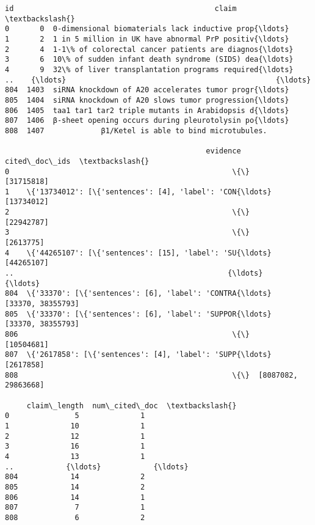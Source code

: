\documentclass[11pt]{article}
\makeatletter
\newcommand{\boxspacing}{\kern\kvtcb@left@rule\kern\kvtcb@boxsep}
\newcommand{\prompt}[4]{
        {\ttfamily\llap{{\color{#2}[#3]:\hspace{3pt}#4}}\vspace{-\baselineskip}}
    }
\makeatother
\begin{document}
            \begin{tcolorbox}[breakable, size=fbox, boxrule=.5pt, pad at break*=1mm, opacityfill=0]
\prompt{Out}{outcolor}{23}{\boxspacing}
\begin{Verbatim}[commandchars=\\\{\}]
       id                                              claim  \textbackslash{}
0       0  0-dimensional biomaterials lack inductive prop{\ldots}
1       2  1 in 5 million in UK have abnormal PrP positiv{\ldots}
2       4  1-1\% of colorectal cancer patients are diagnos{\ldots}
3       6  10\% of sudden infant death syndrome (SIDS) dea{\ldots}
4       9  32\% of liver transplantation programs required{\ldots}
..    {\ldots}                                                {\ldots}
804  1403  siRNA knockdown of A20 accelerates tumor progr{\ldots}
805  1404  siRNA knockdown of A20 slows tumor progression{\ldots}
806  1405  taa1 tar1 tar2 triple mutants in Arabidopsis d{\ldots}
807  1406  β-sheet opening occurs during pleurotolysin po{\ldots}
808  1407             β1/Ketel is able to bind microtubules.

                                              evidence        cited\_doc\_ids  \textbackslash{}
0                                                   \{\}           [31715818]
1    \{'13734012': [\{'sentences': [4], 'label': 'CON{\ldots}           [13734012]
2                                                   \{\}           [22942787]
3                                                   \{\}            [2613775]
4    \{'44265107': [\{'sentences': [15], 'label': 'SU{\ldots}           [44265107]
..                                                 {\ldots}                  {\ldots}
804  \{'33370': [\{'sentences': [6], 'label': 'CONTRA{\ldots}    [33370, 38355793]
805  \{'33370': [\{'sentences': [6], 'label': 'SUPPOR{\ldots}    [33370, 38355793]
806                                                 \{\}           [10504681]
807  \{'2617858': [\{'sentences': [4], 'label': 'SUPP{\ldots}            [2617858]
808                                                 \{\}  [8087082, 29863668]

     claim\_length  num\_cited\_doc  \textbackslash{}
0               5              1
1              10              1
2              12              1
3              16              1
4              13              1
..            {\ldots}            {\ldots}
804            14              2
805            14              2
806            14              1
807             7              1
808             6              2


\end{Verbatim}
\end{tcolorbox}
\end{document}

